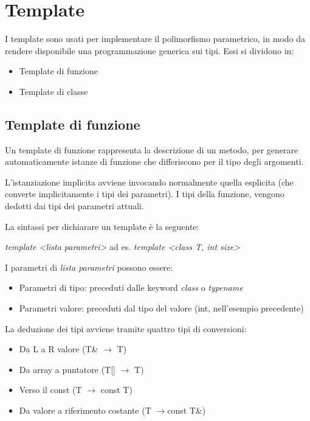 \chapter{Template}
I template sono usati per implementare il polimorfismo parametrico, in modo da rendere disponibile una programmazione generica sui tipi. Essi si dividono in:

\begin{itemize}
	\item Template di funzione
	\item Template di classe
\end{itemize}

\section{Template di funzione}
Un template di funzione rappresenta la descrizione di un metodo, per generare automaticamente istanze di funzione che differiscono per il tipo degli argomenti.



L'istanziazione implicita avviene invocando normalmente quella esplicita (che converte implicitamente i tipi dei parametri). I tipi della funzione, vengono dedotti dai tipi dei parametri attuali.

La sintassi per dichiarare un template è la seguente:

\textit{template <lista parametri>} ad es. \textit{template <class T, int size>}

I parametri di \textit{lista parametri} possono essere:

\begin{itemize}
	\item Parametri di tipo: preceduti dalle keyword \textit{class} o \textit{typename}
	\item Parametri valore: preceduti dal tipo del valore (int, nell'esempio precedente)
\end{itemize}

La deduzione dei tipi avviene tramite quattro tipi di conversioni:

\begin{itemize}
	\item Da L a R valore (T\& $ \rightarrow $ T)
	\item Da array a puntatore (T[] $ \rightarrow $ T\textasteriskcentered )
	\item Verso il const (T $ \rightarrow $ const T)
	\item Da valore a riferimento costante (T $ \rightarrow  $const T\&)
\end{itemize}

